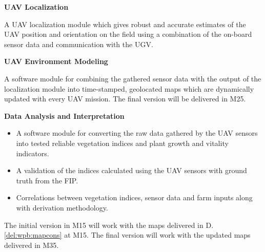 \begin{deliverables}{\WPBNo}

\item {\bf UAV Localization} 
   \label{del:wpb:uavlocal}
   \delresponsible{\ETHZ}

  A UAV localization module which gives robust and accurate estimates of the UAV position and orientation on the field using a combination of the on-board sensor data and communication with the UGV.

\item {\bf UAV Environment Modeling} 
   \label{del:wpb:mapcons}
   \delresponsible{\ETHZ}

   A software module for combining the gathered sensor data with the output of the localization module into time-stamped, geolocated maps which are dynamically updated with every UAV mission.%
The final version 
will be delivered in M25.

\item {\bf Data Analysis and Interpretation} 
   \label{del:wpb:dataanalysis}
   \delresponsible{\ETHZ}
   
   \begin{itemize}
   \item
   A software module for converting the raw data gathered by the UAV sensors into tested reliable vegetation indices and   plant growth and vitality indicators.
   \item
   A validation of the indices calculated using the UAV sensors with ground truth from the FIP.
   \item
   Correlations between vegetation indices, sensor data and farm inputs along with derivation methodology.
   \end{itemize}
   The initial version in M15 will work with the maps delivered in D\WPBNo.\ref{del:wpb:mapcons} at M15. The final version will work with the updated maps delivered in M35.

\end{deliverables}

\fi
